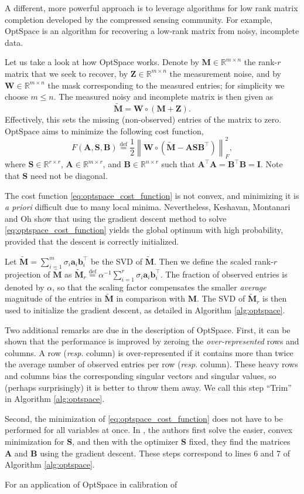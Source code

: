 \documentclass[10pt,double]{IEEEtran}
\providecommand{\R}{\ensuremath{\mathbb{R}}}
\providecommand{\norm}[1]{\left\lVert#1\right\rVert}
\providecommand{\bydef}{\overset{\text{def}}{=}}
\renewcommand{\vec}[1]{\ensuremath{\boldsymbol{#1}}}
\providecommand{\mat}[1]{\ensuremath{\boldsymbol{#1}}}
\providecommand{\wt}[1]{\ensuremath{\widetilde{#1}}}
\providecommand{\mA}{\mat{A}} \providecommand{\mB}{\mat{B}}
\providecommand{\mI}{\mat{I}} \providecommand{\mJ}{\mat{J}}
\providecommand{\mM}{\mat{M}} \providecommand{\mP}{\mat{P}}
\providecommand{\mS}{\mat{S}} \providecommand{\mU}{\mat{U}}
\providecommand{\mW}{\mat{W}}
\providecommand{\mZ}{\mat{Z}}
\providecommand{\va}{\vec{a}} \providecommand{\vb}{\vec{b}}
\newcommand{\T}{\ensuremath{\top}}
\newcommand{\rev}[1]{{#1}}
\begin{document}
A different, more powerful approach is to leverage algorithms for low rank
matrix completion developed by the compressed sensing community. For example,
OptSpace \cite{Keshavan:2010bt} is an algorithm for recovering a low-rank
matrix from noisy, incomplete data. \rev{Let us take a look at how OptSpace works.
Denote by $\mM \in \R^{m \times n}$ the rank-$r$ matrix that we seek to recover,
by $\mZ \in \R^{m \times n}$ the measurement noise, and by $\mW \in \R^{m
\times n}$ the mask corresponding to the measured entries; for simplicity we
choose $m \leq n$. The measured noisy and incomplete matrix is then given as
\begin{equation}
	\wt{\mM} = \mW \circ (\mM + \mZ).
\end{equation}
Effectively, this sets the missing (non-observed) entries of the matrix to
zero. OptSpace aims to minimize the following cost function,
\begin{equation}
  \label{eq:optspace_cost_function}
  F(\mA, \mS, \mB) \bydef  \frac{1}{2} \norm{\mW
  \circ (\wt{\mM} - \mA \mS \mB^\T)}_F^2,
\end{equation}
where $\mS \in \R^{r \times r}$, $\mA \in \R^{m \times r}$, and $\mB \in \R^{n
\times r}$ such that $\mA^\T\!\mA = \mB^\T\!\mB = \mI$. Note that $\mS$ need
not be diagonal.

The cost function \eqref{eq:optspace_cost_function} is not convex, and
minimizing it is \emph{a priori} difficult \cite{Keshavan:2012tb} due to many
local minima. Nevertheless, Keshavan, Montanari and Oh \cite{Keshavan:2010bt}
show that using the gradient descent method to solve
\eqref{eq:optspace_cost_function} yields the global optimum with high
probability, provided that the descent is correctly initialized.

Let $\wt{\mM} = \sum_{i=1}^m \sigma_i \va_i \vb_i^\T$ be the SVD of
$\wt{\mM}$. Then we define the scaled rank-$r$ projection of $\wt{\mM}$ as
$\wt{\mM}_r \bydef \alpha^{-1} \sum_{i=1}^r \sigma_i
\va_i \vb_i^\T$. The fraction of observed entries is denoted by $\alpha$, so
that the scaling factor compensates the smaller \emph{average} magnitude of
the entries in $\wt{\mM}$ in comparison with $\mM$. The SVD of $\wt{\mM}_r$ is
then used to initialize the gradient descent, as detailed in Algorithm
\ref{alg:optspace}.

Two additional remarks are due in the description of OptSpace. First, it can
be shown that the performance is improved by zeroing the \emph{over-represented} rows and columns. A row (\emph{resp}. column) is over-represented
if it contains more than twice the average number of observed entries per row
(\emph{resp.} column). These heavy rows and columns bias the corresponding
singular vectors and singular values, so (perhaps surprisingly) it is better
to throw them away. We call this step ``Trim'' in Algorithm
\ref{alg:optspace}.

Second, the minimization of \eqref{eq:optspace_cost_function} does not have to
be performed for all variables at once. In \cite{Keshavan:2010bt}, the authors
first solve the easier, convex minimization for $\mS$, and then with the
optimizer $\mS$ fixed, they find the matrices $\mA$ and $\mB$ using the
gradient descent. These steps correspond to lines 6 and 7 of Algorithm
\ref{alg:optspace}.} For an application of OptSpace in calibration of
\end{document}

